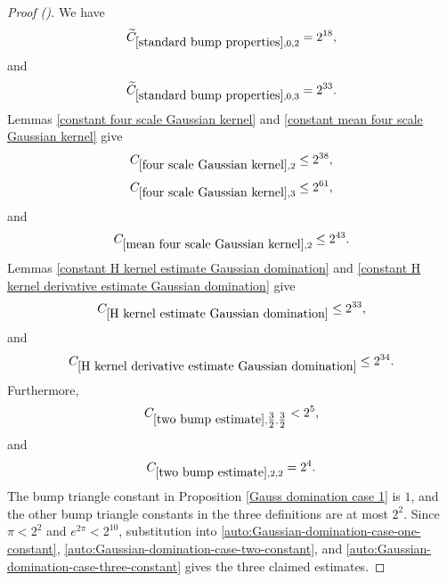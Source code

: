 \documentclass[12pt,reqno]{amsart}
\newcommand{\auto}{{({\tiny\faCar})}}
\theoremstyle{plain}
\numberwithin{equation}{section}
\theoremstyle{remark}
\begin{document}
\begin{proof}[Proof \auto]
We have
\begin{equation}\label{auto:standard-bump-small-constants-for-Gaussian-domination}
\widetilde C_{\ref{standard bump properties},0,2}=2^{18},
\end{equation}
and
\begin{equation}\label{auto:standard-bump-small-constant-three-for-Gaussian-domination}
\widetilde C_{\ref{standard bump properties},0,3}=2^{33}.
\end{equation}
Lemmas \ref{constant four scale Gaussian kernel} and \ref{constant mean four scale Gaussian kernel} give
\begin{equation}\label{auto:four-scale-small-constant-two-for-Gaussian-domination}
C_{\ref{four scale Gaussian kernel},2}\le2^{38},
\end{equation}
\begin{equation}\label{auto:four-scale-small-constant-three-for-Gaussian-domination}
C_{\ref{four scale Gaussian kernel},3}\le2^{61},
\end{equation}
and
\begin{equation}\label{auto:mean-four-scale-small-constant-two-for-Gaussian-domination}
C_{\ref{mean four scale Gaussian kernel},2}\le2^{43}.
\end{equation}
Lemmas \ref{constant H kernel estimate Gaussian domination} and \ref{constant H kernel derivative estimate Gaussian domination} give
\begin{equation}\label{auto:H-kernel-small-constant-for-Gaussian-domination}
C_{\ref{H kernel estimate Gaussian domination}}\le2^{33},
\end{equation}
and
\begin{equation}\label{auto:H-kernel-derivative-small-constant-for-Gaussian-domination}
C_{\ref{H kernel derivative estimate Gaussian domination}}\le2^{34}.
\end{equation}
Furthermore,
\begin{equation}\label{auto:two-bump-small-constant-three-halves-for-Gaussian-domination}
C_{\ref{two bump estimate},\tfrac32,\tfrac32}<2^5,
\end{equation}
and
\begin{equation}\label{auto:two-bump-small-constant-two-for-Gaussian-domination}
C_{\ref{two bump estimate},2,2}=2^4.
\end{equation}
The bump triangle constant in Proposition \ref{Gauss domination case 1} is $1$, and the other bump triangle constants in the three definitions are at most $2^2$. Since $\pi<2^2$ and $e^{2\pi}<2^{10}$, substitution into \eqref{auto:Gaussian-domination-case-one-constant}, \eqref{auto:Gaussian-domination-case-two-constant}, and \eqref{auto:Gaussian-domination-case-three-constant} gives the three claimed estimates.
\end{proof}
\end{document}
